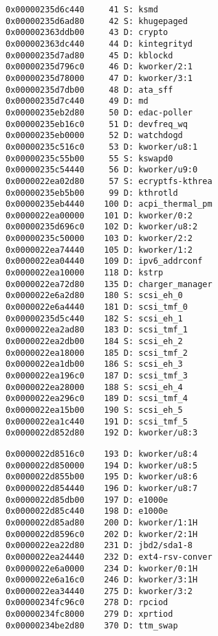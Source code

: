 \begin{itembox}[l]{3}
    \begin{verbatim}
0x00000235d6c440     41 S: ksmd
0x00000235d6ad80     42 S: khugepaged
0x000002363ddb00     43 D: crypto
0x000002363dc440     44 D: kintegrityd
0x00000235d7ad80     45 D: kblockd
0x00000235d796c0     46 D: kworker/2:1
0x00000235d78000     47 D: kworker/3:1
0x00000235d7db00     48 D: ata_sff
0x00000235d7c440     49 D: md
0x00000235eb2d80     50 D: edac-poller
0x00000235eb16c0     51 D: devfreq_wq
0x00000235eb0000     52 D: watchdogd
0x00000235c516c0     53 D: kworker/u8:1
0x00000235c55b00     55 S: kswapd0
0x00000235c54440     56 D: kworker/u9:0
0x0000022ea02d80     57 S: ecryptfs-kthrea
0x00000235eb5b00     99 D: kthrotld
0x00000235eb4440    100 D: acpi_thermal_pm
0x0000022ea00000    101 D: kworker/0:2
0x00000235d696c0    102 D: kworker/u8:2
0x00000235c50000    103 D: kworker/2:2
0x0000022ea74440    105 D: kworker/1:2
0x0000022ea04440    109 D: ipv6_addrconf
0x0000022ea10000    118 D: kstrp
0x0000022ea72d80    135 D: charger_manager
0x0000022e6a2d80    180 S: scsi_eh_0
0x0000022e6a4440    181 D: scsi_tmf_0
0x00000235d5c440    182 S: scsi_eh_1
0x0000022ea2ad80    183 D: scsi_tmf_1
0x0000022ea2db00    184 S: scsi_eh_2
0x0000022ea18000    185 D: scsi_tmf_2
0x0000022ea1db00    186 S: scsi_eh_3
0x0000022ea196c0    187 D: scsi_tmf_3
0x0000022ea28000    188 S: scsi_eh_4
0x0000022ea296c0    189 D: scsi_tmf_4
0x0000022ea15b00    190 S: scsi_eh_5
0x0000022ea1c440    191 D: scsi_tmf_5
0x0000022d852d80    192 D: kworker/u8:3
    \end{verbatim}
\end{itembox}

\begin{itembox}[l]{4}
    \begin{verbatim}
0x0000022d8516c0    193 D: kworker/u8:4
0x0000022d850000    194 D: kworker/u8:5
0x0000022d855b00    195 D: kworker/u8:6
0x0000022d854440    196 D: kworker/u8:7
0x0000022d85db00    197 D: e1000e
0x0000022d85c440    198 D: e1000e
0x0000022d85ad80    200 D: kworker/1:1H
0x0000022d8596c0    202 D: kworker/2:1H
0x0000022ea22d80    231 D: jbd2/sda1-8
0x0000022ea24440    232 D: ext4-rsv-conver
0x0000022e6a0000    234 D: kworker/0:1H
0x0000022e6a16c0    246 D: kworker/3:1H
0x0000022ea34440    275 D: kworker/3:2
0x00000234fc96c0    278 D: rpciod
0x00000234fc8000    279 D: xprtiod
0x00000234be2d80    370 D: ttm_swap
    \end{verbatim}
\end{itembox}

